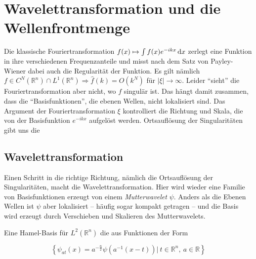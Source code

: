 \section{Wavelettransformation und die Wellenfrontmenge} %
\label{sec:shearlets}

Die klassische Fouriertransformation $f(x) \mapsto \int f(x) e^{-ik x} \mathop{}\!\mathrm{d} x$
zerlegt eine Funktion in ihre verschiedenen Frequenzanteile und misst nach dem Satz von Payley-Wiener dabei auch die Regularität der Funktion. Es gilt nämlich $f \in C^N(\mathbb{R}^n) \cap L^1(\mathbb{R}^n) \Rightarrow \hat f(k) = O(k^N) $ für $|\xi| \to \infty$. Leider "`sieht"' die Fouriertransformation aber nicht, wo $f$ singulär ist. Das hängt damit zusammen, dass die "`Basisfunktionen"', die ebenen Wellen, nicht lokalisiert sind. Das Argument der Fouriertransformation $\xi$ kontrolliert die Richtung und Skala, die von der Basisfunktion $e^{-ikx}$ aufgelöst werden. Ortsauflösung der Singularitäten gibt uns die




\subsection{Wavelettransformation} %
\label{sec:wavelettransformation}


Einen Schritt in die richtige Richtung, nämlich die Ortsauflösung der Singularitäten, macht die Wavelettransformation. Hier wird wieder eine Familie von Basisfunktionen erzeugt von einem \textit{Mutterwavelet} $\psi$. Anders als die Ebenen Wellen ist $\psi$ aber lokalisiert -- häufig sogar kompakt getragen -- und die Basis wird erzeugt durch Verschieben und Skalieren des Mutterwavelets.

Eine Hamel-Basis für $L^2(\mathbb{R}^n)$ die aus Funktionen der Form

\begin{equation*}
    \left\{\psi_{at}(x) = a^{-\frac{n}{2}}\psi\left(a^{-1}(x-t)\right)  |~ t \in \mathbb{R}^n,  ~a \in \mathbb{R}\right\}
\end{equation*}


